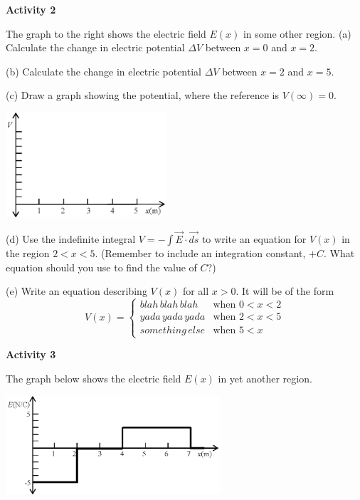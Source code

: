 \textbf{Activity 2} 

The graph to the right shows the electric field $E(x)$ in some other region.
(a) Calculate the change in electric potential $\Delta V$ between $x=0$ and $x=2$.
\vspace{0.7in}

(b) Calculate the change in electric potential $\Delta V$ between $x=2$ and $x=5$.
\vspace{0.7in}

(c) Draw a graph showing the potential, where the reference is $V(\infty)=0$.
\begin{center}
\includegraphics[width=0.45\textwidth]{finding_v_from_e/fig4.eps}
\end{center}

(d) Use the indefinite integral $V =-\int{\vec{E} \cdot \vec{ds}}$  to write an equation for $V(x)$ in the region $2<x<5$.  (Remember to include an integration constant, $+C$.  What equation should you use to find the value of $C$?)
\vspace{1.2in}


(e) Write an equation describing $V(x)$ for all $x>0$.  It will be of the form
\begin{displaymath}
V(x) = \begin{cases}
        blah \, blah \, blah  & \textrm{when } 0<x<2\\
        yada \, yada \, yada & \textrm{when }  2<x<5\\
        something \, else & \textrm{when }  5 < x
        \end{cases}
\end{displaymath}
\vspace{1.2in}

\pagebreak
\textbf{Activity 3} 

The graph below shows the electric field $E(x)$ in yet another region.
\begin{center}
\includegraphics[width=0.6\textwidth]{finding_v_from_e/fig5.eps}
\end{center}

